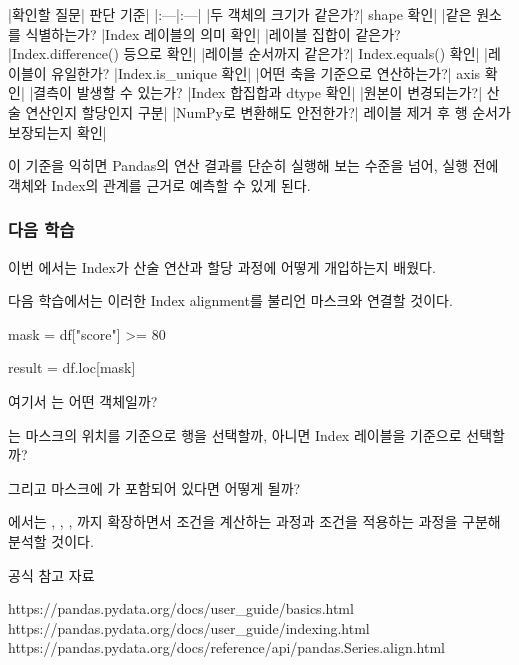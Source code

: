 \begin{dhktable}
|확인할 질문|	판단 기준|
|:---|:---|
|두 객체의 크기가 같은가?|	shape 확인|
|같은 원소를 식별하는가?	|Index 레이블의 의미 확인|
|레이블 집합이 같은가?	|Index.difference() 등으로 확인|
|레이블 순서까지 같은가?|	Index.equals() 확인|
|레이블이 유일한가?	|Index.is_unique 확인|
|어떤 축을 기준으로 연산하는가?|	axis 확인|
|결측이 발생할 수 있는가?	|Index 합집합과 dtype 확인|
|원본이 변경되는가?|	산술 연산인지 할당인지 구분|
|NumPy로 변환해도 안전한가?|	레이블 제거 후 행 순서가 보장되는지 확인|
\end{dhktable}

이 기준을 익히면 Pandas의 연산 결과를 단순히 실행해 보는 수준을 넘어, 실행 전에 객체와 Index의 관계를 근거로 예측할 수 있게 된다.

\subsubsection{다음 학습}

이번 에서는 Index가 산술 연산과 할당 과정에 어떻게 개입하는지 배웠다.

다음 학습에서는 이러한 Index alignment를 불리언 마스크와 연결할 것이다.

\begin{dhkcode}
mask = df["score"] >= 80

result = df.loc[mask]
\end{dhkcode}

여기서 는 어떤 객체일까?

는 마스크의 위치를 기준으로 행을 선택할까, 아니면 Index 레이블을 기준으로 선택할까?

그리고 마스크에 가 포함되어 있다면 어떻게 될까?

에서는 , , , 까지 확장하면서 조건을 계산하는 과정과 조건을 적용하는 과정을 구분해 분석할 것이다.

공식 참고 자료

\begin{dhksmry}
https://pandas.pydata.org/docs/user_guide/basics.html
https://pandas.pydata.org/docs/user_guide/indexing.html
https://pandas.pydata.org/docs/reference/api/pandas.Series.align.html
\end{dhksmry}